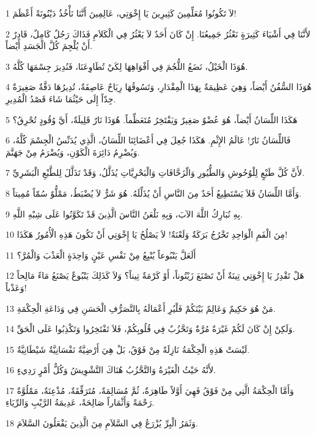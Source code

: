 \par 1 لاَ تَكُونُوا مُعَلِّمِينَ كَثِيرِينَ يَا إِخْوَتِي، عَالِمِينَ أَنَّنَا نَأْخُذُ دَيْنُونَةً أَعْظَمَ!
\par 2 لأَنَّنَا فِي أَشْيَاءَ كَثِيرَةٍ نَعْثُرُ جَمِيعُنَا. إِنْ كَانَ أَحَدٌ لاَ يَعْثُرُ فِي الْكَلاَمِ فَذَاكَ رَجُلٌ كَامِلٌ، قَادِرٌ أَنْ يُلْجِمَ كُلَّ الْجَسَدِ أَيْضاً.
\par 3 هُوَذَا الْخَيْلُ، نَضَعُ اللُّجُمَ فِي أَفْوَاهِهَا لِكَيْ تُطَاوِعَنَا، فَنُدِيرَ جِسْمَهَا كُلَّهُ.
\par 4 هُوَذَا السُّفُنُ أَيْضاً، وَهِيَ عَظِيمَةٌ بِهَذَا الْمِقْدَارِ، وَتَسُوقُهَا رِيَاحٌ عَاصِفَةٌ، تُدِيرُهَا دَفَّةٌ صَغِيرَةٌ جِدّاً إِلَى حَيْثُمَا شَاءَ قَصْدُ الْمُدِيرِ.
\par 5 هَكَذَا اللِّسَانُ أَيْضاً، هُوَ عُضْوٌ صَغِيرٌ وَيَفْتَخِرُ مُتَعَظِّماً. هُوَذَا نَارٌ قَلِيلَةٌ، أَيَّ وُقُودٍ تُحْرِقُ؟
\par 6 فَاللِّسَانُ نَارٌ! عَالَمُ الإِثْمِ. هَكَذَا جُعِلَ فِي أَعْضَائِنَا اللِّسَانُ، الَّذِي يُدَنِّسُ الْجِسْمَ كُلَّهُ، وَيُضْرِمُ دَائِرَةَ الْكَوْنِ، وَيُضْرَمُ مِنْ جَهَنَّمَ.
\par 7 لأَنَّ كُلَّ طَبْعٍ لِلْوُحُوشِ وَالطُّيُورِ وَالّزَحَّافَاتِ وَالْبَحْرِيَّاتِ يُذَلَّلُ، وَقَدْ تَذَلَّلَ لِلطَّبْعِ الْبَشَرِيِّ.
\par 8 وَأَمَّا اللِّسَانُ فَلاَ يَسْتَطِيعُ أَحَدٌ مِنَ النَّاسِ أَنْ يُذَلِّلَهُ. هُوَ شَرٌّ لاَ يُضْبَطُ، مَمْلُّوٌ سُمّاً مُمِيتاً.
\par 9 بِهِ نُبَارِكُ اللَّهَ الآبَ، وَبِهِ نَلْعَنُ النَّاسَ الَّذِينَ قَدْ تَكَوَّنُوا عَلَى شِبْهِ اللَّهِ.
\par 10 مِنَ الْفَمِ الْوَاحِدِ تَخْرُجُ بَرَكَةٌ وَلَعْنَةٌ! لاَ يَصْلُحُ يَا إِخْوَتِي أَنْ تَكُونَ هَذِهِ الْأُمُورُ هَكَذَا!
\par 11 أَلَعَلَّ يَنْبُوعاً يُنْبِعُ مِنْ نَفْسِ عَيْنٍ وَاحِدَةٍ الْعَذْبَ وَالْمُرَّ؟
\par 12 هَلْ تَقْدِرُ يَا إِخْوَتِي تِينَةٌ أَنْ تَصْنَعَ زَيْتُوناً، أَوْ كَرْمَةٌ تِيناً؟ وَلاَ كَذَلِكَ يَنْبُوعٌ يَصْنَعُ مَاءً مَالِحاً وَعَذْباً!
\par 13 مَنْ هُوَ حَكِيمٌ وَعَالِمٌ بَيْنَكُمْ فَلْيُرِ أَعْمَالَهُ بِالتَّصَرُّفِ الْحَسَنِ فِي وَدَاعَةِ الْحِكْمَةِ.
\par 14 وَلَكِنْ إِنْ كَانَ لَكُمْ غَيْرَةٌ مُرَّةٌ وَتَحَّزُبٌ فِي قُلُوبِكُمْ، فَلاَ تَفْتَخِرُوا وَتَكْذِبُوا عَلَى الْحَقِّ.
\par 15 لَيْسَتْ هَذِهِ الْحِكْمَةُ نَازِلَةً مِنْ فَوْقُ، بَلْ هِيَ أَرْضِيَّةٌ نَفْسَانِيَّةٌ شَيْطَانِيَّةٌ.
\par 16 لأَنَّهُ حَيْثُ الْغَيْرَةُ وَالتَّحَّزُبُ هُنَاكَ التَّشْوِيشُ وَكُلُّ أَمْرٍ رَدِيءٍ.
\par 17 وَأَمَّا الْحِكْمَةُ الَّتِي مِنْ فَوْقُ فَهِيَ أَوَّلاً طَاهِرَةٌ، ثُمَّ مُسَالِمَةٌ، مُتَرَفِّقَةٌ، مُذْعِنَةٌ، مَمْلُوَّةٌ رَحْمَةً وَأَثْمَاراً صَالِحَةً، عَدِيمَةُ الرَّيْبِ وَالرِّيَاءِ.
\par 18 وَثَمَرُ الْبِرِّ يُزْرَعُ فِي السَّلاَمِ مِنَ الَّذِينَ يَفْعَلُونَ السَّلاَمَ.

